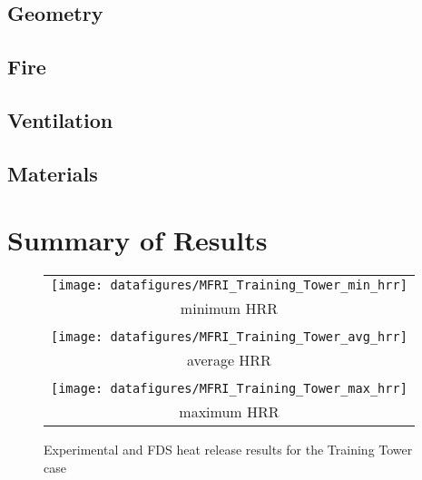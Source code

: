 \subsection{Geometry}

\subsection{Fire}

\subsection{Ventilation}

\subsection{Materials}

\section{Summary of Results}

\begin{figure}[\figoptions]
\begin{center}
\begin{tabular}{c}
 \texttt{[image: datafigures/MFRI\_Training\_Tower\_min\_hrr]}\\
 minimum HRR\\
 \\
 \texttt{[image: datafigures/MFRI\_Training\_Tower\_avg\_hrr]}\\
 average HRR\\
 \\
 \texttt{[image: datafigures/MFRI\_Training\_Tower\_max\_hrr]}\\
 maximum HRR\\
\end{tabular}
\end{center}
\caption {Experimental and FDS heat release results for the
Training Tower case}
\label{figtrainingtowerhrr}%
\end{figure}

